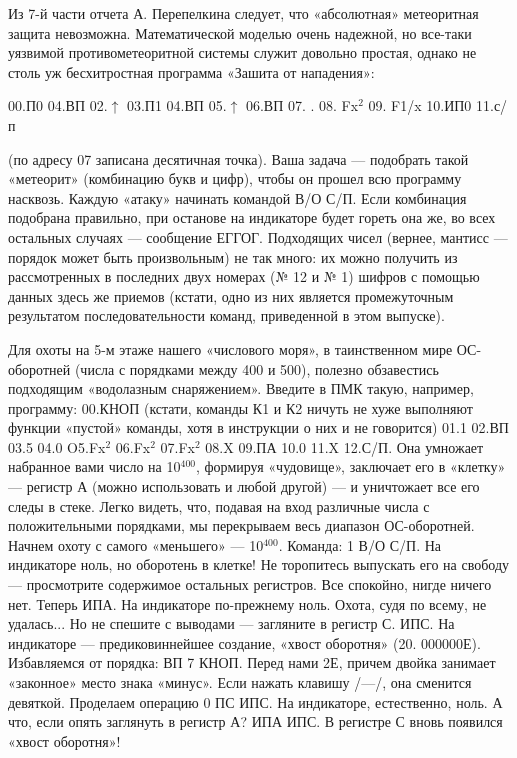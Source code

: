 \documentclass[11pt,a4paper,oneside]{article}
\begin{document}
Из 7-й части отчета А. Перепелкина следует, что «абсолютная» метеоритная защита невозможна. Математической моделью очень надежной, но все-таки уязвимой противометеоритной системы служит довольно простая, однако не столь уж бесхитростная программа «Зашита от нападения»:

00.П0 04.ВП 02.$\uparrow$ 03.П1 04.ВП 05.$\uparrow$ 06.ВП 07. . 08. Fx$^{2}$ 09. F1/x 10.ИП0 11.с/п

(по адресу 07 записана десятичная точка). Ваша задача — подобрать такой «метеорит» (комбинацию букв и цифр), чтобы он прошел всю программу насквозь. Каждую «атаку» начинать командой В/О С/П. Если комбинация подобрана правильно, при останове на индикаторе будет гореть она же, во всех остальных случаях — сообщение ЕГГОГ. Подходящих чисел (вернее, мантисс — порядок может быть произвольным) не так много: их можно получить из рассмотренных в последних двух номерах (№ 12 и № 1) шифров с помощью данных здесь же приемов (кстати, одно из них является промежуточным результатом последовательности команд, приведенной в этом выпуске).

Для охоты на 5-м этаже нашего «числового моря», в таинственном мире ОС-оборотней (числа с порядками между 400 и 500), полезно обзавестись подходящим «водолазным снаряжением». Введите в ПМК такую, например, программу: 00.КНОП (кстати, команды К1 и К2 ничуть не хуже выполняют функции «пустой» команды, хотя в инструкции о них и не говорится) 01.1 02.ВП 03.5 04.0 O5.Fx$^{2}$ 06.Fx$^{2}$ 07.Fx$^{2}$ 08.X 09.ПА 10.0 11.X 12.С/П. Она умножает набранное вами число на 10$^{400}$, формируя «чудовище», заключает его в «клетку» — регистр А (можно использовать и любой другой) — и уничтожает все его следы в стеке. Легко видеть, что, подавая на вход различные числа с положительными порядками, мы перекрываем весь диапазон ОС-оборотней. Начнем охоту с самого «меньшего» — 10$^{400}$. Команда: 1 В/О С/П. На индикаторе ноль, но оборотень в клетке! Не торопитесь выпускать его на свободу — просмотрите содержимое остальных регистров. Все спокойно, нигде ничего нет. Теперь ИПА. На индикаторе по-прежнему ноль. Охота, судя по всему, не удалась... Но не спешите с выводами — загляните в регистр С. ИПС. На индикаторе — предиковиннейшее создание, «хвост оборотня» (20. 000000Е). Избавляемся от порядка: ВП 7 КНОП. Перед нами 2Е, причем двойка занимает «законное» место знака «минус». Если нажать клавишу /—/, она сменится девяткой. Проделаем операцию 0 ПС ИПС. На индикаторе, естественно, ноль. А что, если опять заглянуть в регистр А? ИПА ИПС. В регистре С вновь появился «хвост оборотня»!
\end{document}
